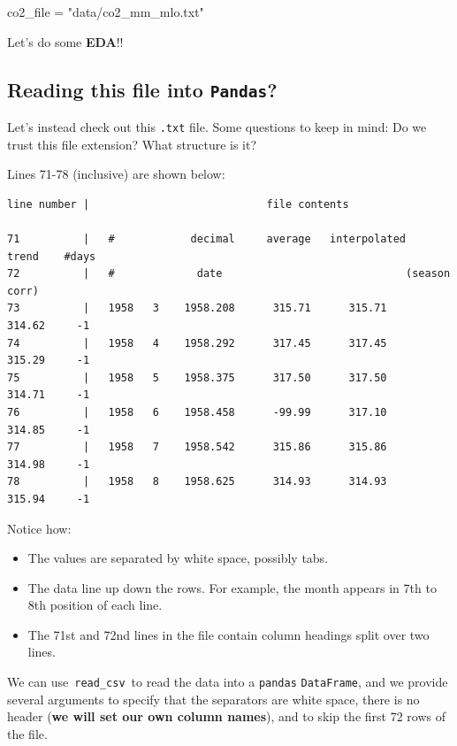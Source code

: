 \documentclass[
  letterpaper,
  DIV=11,
  numbers=noendperiod]{scrreprt}
\newenvironment{Shaded}{\begin{snugshade}}{\end{snugshade}}
\newcommand{\NormalTok}[1]{\textcolor[rgb]{0.00,0.23,0.31}{#1}}
\newcommand{\OperatorTok}[1]{\textcolor[rgb]{0.37,0.37,0.37}{#1}}
\newcommand{\StringTok}[1]{\textcolor[rgb]{0.13,0.47,0.30}{#1}}
\providecommand{\tightlist}{%
  \setlength{\itemsep}{0pt}\setlength{\parskip}{0pt}}\usepackage{longtable,booktabs,array}
\begin{document}
\begin{Shaded}
\begin{Highlighting}[]
\NormalTok{co2\_file }\OperatorTok{=} \StringTok{"data/co2\_mm\_mlo.txt"}
\end{Highlighting}
\end{Shaded}

Let's do some \textbf{EDA}!!

\subsection{\texorpdfstring{Reading this file into
\texttt{Pandas}?}{Reading this file into Pandas?}}\label{reading-this-file-into-pandas}

Let's instead check out this \texttt{.txt} file. Some questions to keep
in mind: Do we trust this file extension? What structure is it?

Lines 71-78 (inclusive) are shown below:

\begin{verbatim}
line number |                            file contents

71          |   #            decimal     average   interpolated    trend    #days
72          |   #             date                             (season corr)
73          |   1958   3    1958.208      315.71      315.71      314.62     -1
74          |   1958   4    1958.292      317.45      317.45      315.29     -1
75          |   1958   5    1958.375      317.50      317.50      314.71     -1
76          |   1958   6    1958.458      -99.99      317.10      314.85     -1
77          |   1958   7    1958.542      315.86      315.86      314.98     -1
78          |   1958   8    1958.625      314.93      314.93      315.94     -1
\end{verbatim}

Notice how:

\begin{itemize}
\tightlist
\item
  The values are separated by white space, possibly tabs.
\item
  The data line up down the rows. For example, the month appears in 7th
  to 8th position of each line.
\item
  The 71st and 72nd lines in the file contain column headings split over
  two lines.
\end{itemize}

We can use~\texttt{read\_csv}~to read the data into a \texttt{pandas}
\texttt{DataFrame}, and we provide several arguments to specify that the
separators are white space, there is no header (\textbf{we will set our
own column names}), and to skip the first 72 rows of the file.
\end{document}
